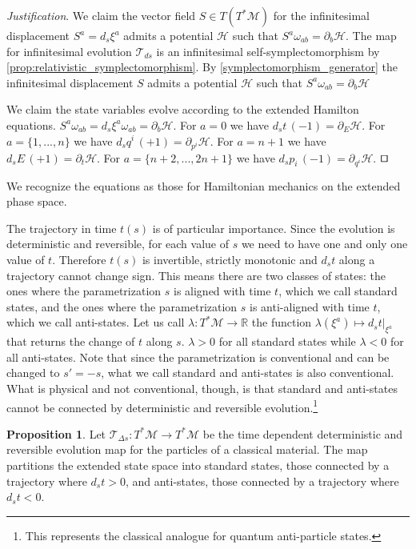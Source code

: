 \documentclass[smallextended]{svjour3}
\numberwithin{equation}{section}
\newenvironment{justification}{\emph{Justification}.}{\hfill\(\qed\)}
\theoremstyle{definition}
\newtheorem{prop}[equation]{Proposition}
\newenvironment{justification}{\emph{Justification}.}{\qed}
\begin{document}
\begin{justification}
We claim the vector field $S \in T(T^*\mathcal{M})$ for the infinitesimal displacement $S^a = d_s\xi^a$ admits a potential $\mathcal{H}$ such that $S^{a} \omega_{ab} = \partial_{b}\mathcal{H}$. The map for infinitesimal evolution $\mathcal{T}_{ds}$ is an infinitesimal self-symplectomorphism by \ref{prop:relativistic_symplectomorphism}. By \ref{symplectomorphism_generator} the infinitesimal displacement $S$ admits a potential $\mathcal{H}$ such that $S^{a} \omega_{ab} = \partial_{b}\mathcal{H}$

We claim the state variables evolve according to the extended Hamilton equations. $S^{a} \omega_{ab} = d_s\xi^a \omega_{ab} = \partial_{b}\mathcal{H}$. For $a = 0$ we have $d_s t \, (-1) = \partial_{E} \mathcal{H}$. For  $a=\{1,...,n\}$ we have $d_s q^i \, (+1) = \partial_{p^i} \mathcal{H}$. For $a=n+1$ we have $d_s E \, (+1) = \partial_{t} \mathcal{H}$. For $a=\{n+2,...,2n + 1\}$ we have $d_s p_i \, (-1) = \partial_{q^i} \mathcal{H}$.
\end{justification}

We recognize the equations as those for Hamiltonian mechanics on the extended phase space.\cite{Synge,Lanczos,Struckmeier}

The trajectory in time $t(s)$ is of particular importance. Since the evolution is deterministic and reversible, for each value of $s$ we need to have one and only one value of $t$. Therefore $t(s)$ is invertible, strictly monotonic and $d_{s}t$ along a trajectory cannot change sign. This means there are two classes of states: the ones where the parametrization $s$ is aligned with time $t$, which we call standard states, and the ones where the parametrization $s$ is anti-aligned with time $t$, which we call anti-states. Let us call $\lambda : T^*\mathcal{M} \rightarrow \mathbb{R}$ the function $\lambda (\xi^a) \mapsto d_s t |_{\xi^a}$ that returns the change of $t$ along $s$. $\lambda > 0$ for all standard states while $\lambda < 0$ for all anti-states.  Note that since the parametrization is conventional and can be changed to $s'=-s$, what we call standard and anti-states is also conventional. What is physical and not conventional, though, is that standard and anti-states cannot be connected by deterministic and reversible evolution.\footnote{This represents the classical analogue for quantum anti-particle states.}

\begin{prop}\label{prop:antistates}
	Let $\mathcal{T}_{\Delta s}: T^*\mathcal{M} \rightarrow T^*\mathcal{M}$ be the time dependent deterministic and reversible evolution map for the particles of a classical material. The map partitions the extended state space into standard states, those connected by a trajectory where $d_{s}t>0$, and anti-states, those connected by a trajectory where $d_{s}t<0$.
\end{prop}
\end{document}
